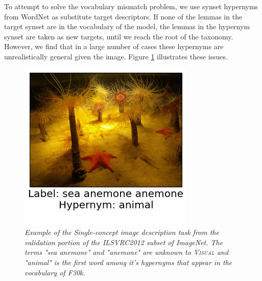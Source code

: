 To attempt to solve the vocabulary mismatch problem, we use synset hypernyms
from WordNet as substitute target descriptors. If none of the lemmas
in the target synset are in the vocabulary of the model, the lemmas in
the hypernym synset are taken as new targets, until we reach the root
of the taxonomy. However, we find that in a large number of cases these hypernyms
are unrealistically general given the image. Figure \ref{fig:synset-descriptors}
illustrates these issues.

\begin{figure}
\centering
\includegraphics[scale=0.5]{chapters/TAL/starfish}
\caption{\textit{Example of the Single-concept image description task from
the validation portion of the ILSVRC2012 subset of ImageNet. The terms
"sea anemone" and "anemone" are unknown to \textsc{Visual} and "animal"
is the first word among it's hypernyms that appear in the vocabulary of F30k.}}
\label{fig:synset-descriptors}
\end{figure}
